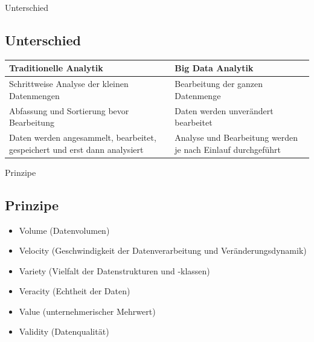 \documentclass[11pt]{beamer}
\begin{document}
\begin{frame}{Unterschied}
\subsection{Unterschied}
\begin{table}
\begin{tabular}{|l|l|}

Traditionelle Analytik & Big Data Analytik \\ \hline
Schrittweise Analyse der kleinen Datenmengen & Bearbeitung der ganzen Datenmenge \\ \hline
Abfassung und Sortierung bevor Bearbeitung & Daten werden unverändert bearbeitet \\ \hline
Daten werden angesammelt, bearbeitet, gespeichert und erst dann analysiert & Analyse und Bearbeitung werden je nach Einlauf durchgeführt 

\end{tabular}
\end{table}
\end{frame}

\begin{frame}{Prinzipe}
\subsection{Prinzipe}
\begin{itemize}
\item Volume (Datenvolumen)
\item Velocity (Geschwindigkeit der Datenverarbeitung und Veränderungsdynamik)
\item Variety (Vielfalt der Datenstrukturen und -klassen)
\item Veracity (Echtheit der Daten)
\item Value (unternehmerischer Mehrwert)
\item Validity (Datenqualität)
\end{itemize}
\end{frame}
\end{document}
